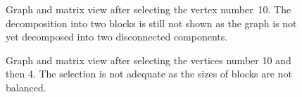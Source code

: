 \documentclass[12pt, twoside]{book}
\begin{document}
\begin{figure}
\centering
{}%
\caption{Graph and matrix view after selecting the vertex number~10. The decomposition into two blocks is still not shown as the graph is not yet decomposed into two disconnected components.}
\label{selected10}
\end{figure}


\begin{figure}
\centering
{}%
\caption{Graph and matrix view after selecting the vertices number 10 and then 4. The selection is not adequate as the sizes of blocks are not balanced.}
\label{selected410}
\end{figure}
\end{document}
